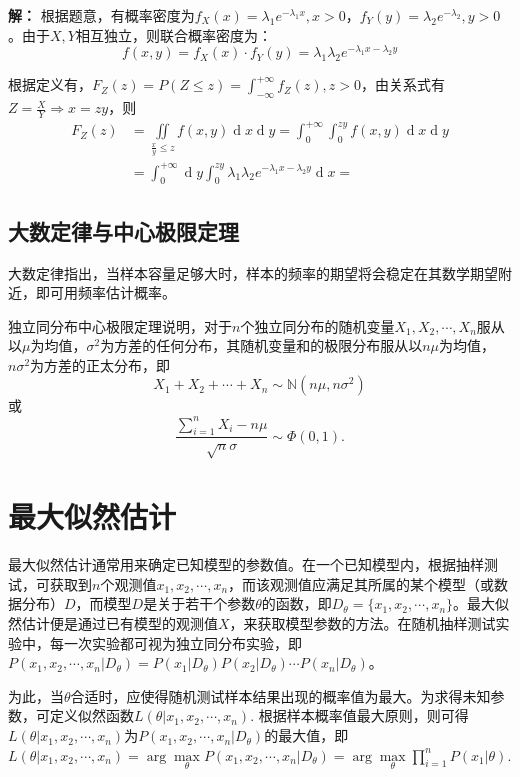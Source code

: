 \documentclass[12pt,a4paper]{article}
\begin{document}
  \textbf{解：} 根据题意，有概率密度为$f_X(x) = \lambda _1 e^{-\lambda _1 x}, x > 0$，$f_Y(y) = \lambda _2 e^{-\lambda _2}, y > 0$。由于$X,Y$相互独立，则联合概率密度为：
  $$
  f(x,y) = f_X(x)\cdot f_Y(y) = \lambda _1 \lambda _2 e^{-\lambda _1 x - \lambda _2 y}
  $$

  根据定义有，$F_Z(z) = P(Z \leq z)=\int _{-\infty}^{+\infty} f_Z(z), z > 0$，由关系式有$Z=\frac{X}{Y}\Rightarrow x=zy$，则 
  $$
  \begin{aligned}
    F_Z(z) &= \iint\limits_{\frac{x}{y} \leq z} f(x,y) \operatorname{d}x \operatorname{d}y = \int_0^{+\infty} \int _0^{z y} f(x,y)\operatorname{d}x \operatorname{d}y \\ 
    &= \int_0^{+\infty} \operatorname{d}y \int _0^{z y} \lambda _1 \lambda _2 e^{-\lambda _1 x - \lambda _2 y} \operatorname{d}x = 
  \end{aligned}
  $$

  \subsection{大数定律与中心极限定理}
  大数定律指出，当样本容量足够大时，样本的频率的期望将会稳定在其数学期望附近，即可用频率估计概率。

  独立同分布中心极限定理说明，对于$n$个独立同分布的随机变量$X_1, X_2, \cdots, X_n$服从以$\mu$为均值，$\sigma^2$为方差的任何分布，其随机变量和的极限分布服从以$n\mu$为均值，$n\sigma^2$为方差的正太分布，即$$X_1+X_2+\cdots+X_n \sim \mathbb{N}(n\mu, n\sigma^2)$$或$$\frac{\sum_{i=1}^n X_i - n\mu}{\sqrt{n}\sigma} \sim \Phi(0, 1).$$

  \section{最大似然估计}
  最大似然估计通常用来确定已知模型的参数值。在一个已知模型内，根据抽样测试，可获取到$n$个观测值$x_1, x_2, \cdots, x_n$，而该观测值应满足其所属的某个模型（或数据分布）$D$，而模型$D$是关于若干个参数$\theta$的函数，即$D_\theta = \{x_1, x_2, \cdots, x_n\}$。最大似然估计便是通过已有模型的观测值$X$，来获取模型参数的方法。在随机抽样测试实验中，每一次实验都可视为独立同分布实验，即$P(x_1, x_2, \cdots, x_n|D_\theta)=P(x_1|D_\theta)P(x_2|D_\theta)\cdots P(x_n|D_\theta)$。

  为此，当$\theta$合适时，应使得随机测试样本结果出现的概率值为最大。为求得未知参数，可定义似然函数$L(\theta|x_1,x_2,\cdots,x_n)$. 根据样本概率值最大原则，则可得$L(\theta|x_1,x_2,\cdots,x_n)$为$P(x_1, x_2, \cdots, x_n|D_\theta)$的最大值，即$L(\theta|x_1,x_2,\cdots,x_n) = \arg \max\limits_\theta P(x_1, x_2, \cdots, x_n|D_\theta)=\arg \max\limits_\theta \prod\limits_{i=1}^n P(x_1|\theta)$.
\end{document}
